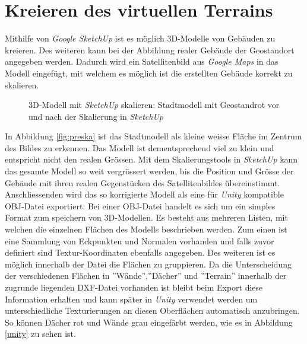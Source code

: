 \section{Kreieren des virtuellen Terrains}\label{s.terrain}
Mithilfe von \textit{Google SketchUp} ist es möglich 3D-Modelle von Gebäuden zu kreieren. Des weiteren kann bei der Abbildung realer Gebäude der Geostandort angegeben werden. Dadurch wird ein Satellitenbild aus \textit{Google Maps} in das Modell eingefügt, mit welchem es möglich ist die erstellten Gebäude korrekt zu skalieren.

\begin{figure}[htp]%
	\centering	
	\hspace{48pt}%
	\hspace{8pt}%

	\caption[3D-Modell mit \textit{SketchUp} skalieren]
	{3D-Modell mit \textit{SketchUp} skalieren:
		 Stadtmodell mit Geostandrot vor und
		 nach der Skalierung in \textit{SketchUp}}%
	\label{fig:sketchup} %
\end{figure}

In Abbildung \ref{fig:preska} ist das Stadtmodell als kleine weisse Fläche im Zentrum des Bildes zu erkennen. Das Modell ist dementsprechend viel zu klein und entspricht nicht den realen Grössen. Mit dem Skalierungstools in \textit{SketchUp} kann das gesamte Modell so weit vergrössert werden, bis die Position und Grösse der Gebäude mit ihren realen Gegenstücken des Satellitenbildes übereinstimmt.\\[6pt]
Anschliessenden wird das so korrigierte Modell als eine für \textit{Unity} kompatible OBJ-Datei exportiert. Bei einer OBJ-Datei handelt es sich um ein simples Format zum speichern von 3D-Modellen. Es besteht aus mehreren Listen, mit welchen die einzelnen Flächen des Modells beschrieben werden. Zum einen ist eine Sammlung von Eckpunkten und Normalen vorhanden und falls zuvor definiert sind Textur-Koordinaten ebenfalls angegeben. Des weiteren ist es möglich innerhalb der Datei die Flächen zu gruppieren. Da die Unterscheidung der verschiedenen Flächen in ''Wände'',''Dächer'' und ''Terrain'' innerhalb der zugrunde liegenden DXF-Datei vorhanden ist bleibt beim Export diese Information erhalten und kann später in \textit{Unity} verwendet werden um unterschiedliche Texturierungen an diesen Oberflächen automatisch anzubringen. So können Dächer rot und Wände grau eingefärbt werden, wie es in Abbildung \ref{unity} zu sehen ist.\\[6pt]

